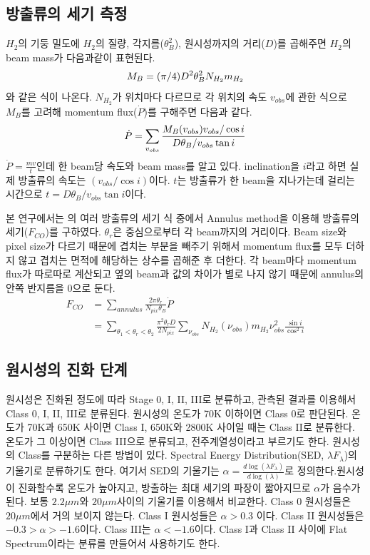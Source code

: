 \subsection{방출류의 세기 측정}
$H_2$의 기둥 밀도에 $H_2$의 질량, 각지름($\theta_B^2$), 원시성까지의 거리($D$)를 곱해주면 $H_2$의 beam mass가 다음과같이 표현된다.
\begin{equation}
M_B=(\pi/4)D^2\theta_B^2N_{H_2}m_{H_2}\\
\end{equation}
와 같은 식이 나온다. $N_{H_2}$가 위치마다 다르므로 각 위치의 속도 $v_{obs}$에 관한 식으로 $M_B$를 고려해 momentum flux($\dot{P}$)를 구해주면 다음과 같다.
\begin{equation}
\dot{P}=\sum_{v_{obs}} \frac{M_B(v_{obs})v_{obs}/\cos i}{D\theta_B/v_{obs} \tan i} \\
\end{equation}
$\dot{P}=\frac{mv}{t}$인데 한 beam당 속도와 beam mass를 알고 있다. inclination을 $i$라고 하면 실제 방출류의 속도는 $(v_{obs}/\cos{i})$이다. $t$는 방출류가 한 beam을 지나가는데 걸리는 시간으로 $t=D\theta_B/v_{obs} \tan i$이다.	

본 연구에서는 \cite{Marel} 의 여러 방출류의 세기 식 중에서 Annulus method을 이용해 방출류의 세기($F_{CO}$)를 구하였다. $\theta_{r}$은 중심으로부터 각 beam까지의 거리이다. Beam size와 pixel size가 다르기 때문에 겹치는 부분을 빼주기 위해서 momentum flux를 모두 더하지 않고 겹치는 면적에 해당하는 상수를 곱해준 후 더한다. 각 beam마다 momentum flux가 따로따로 계산되고 옆의 beam과 값의 차이가 별로 나지 않기 때문에 annulus의 안쪽 반지름을 0으로 둔다. 
\begin{align}
	F_{CO} &=\sum_{annulus}\frac{2\pi\theta_r}{N_{pix}\theta_B} \dot{P} \\
	&= \sum_{\theta_1<\theta_r<\theta_2} \frac{\pi^2\theta_rD}{2N_{pix}} \sum_{\nu_{obs}} N_{H_2}(\nu_{obs})m_{H_2}\nu_{obs}^2 \frac{\sin i}{\cos^2 i} \label{FCO}
\end{align}

\subsection{원시성의 진화 단계}
원시성은 진화된 정도에 따라 Stage 0, I, II, III로 분류하고, 관측된 결과를 이용해서 Class 0, I, II, III로 분류된다. 원시성의 온도가 70K 이하이면 Class 0로 판단된다. 온도가 70K과 650K 사이면 Class I, 650K와 2800K 사이일 때는 Class II로 분류한다. 온도가 그 이상이면 Class III으로 분류되고, 전주계열성이라고 부르기도 한다. 원시성의 Class를 구분하는 다른 방법이 있다. Spectral Energy Distribution(SED, $\lambda F_{\lambda}$)의 기울기로 분류하기도 한다. 여기서 SED의 기울기는 $\alpha=\frac{d\log(\lambda F_\lambda)}{d\log(\lambda)}$로 정의한다.원시성이 진화할수록 온도가 높아지고, 방출하는 최대 세기의 파장이 짧아지므로 $\alpha$가 음수가 된다. 보통 $2.2\mu m$와 $20 \mu m$사이의 기울기를 이용해서 비교한다. Class 0 원시성들은 $20 \mu m$에서 거의 보이지 않는다. Class I 원시성들은 $\alpha > 0.3$ 이다. Class II 원시성들은 $-0.3 > \alpha > -1.6$이다. Class III는 $\alpha < -1.6$이다. Class I과 Class II 사이에 Flat Spectrum이라는 분류를 만들어서 사용하기도 한다.

